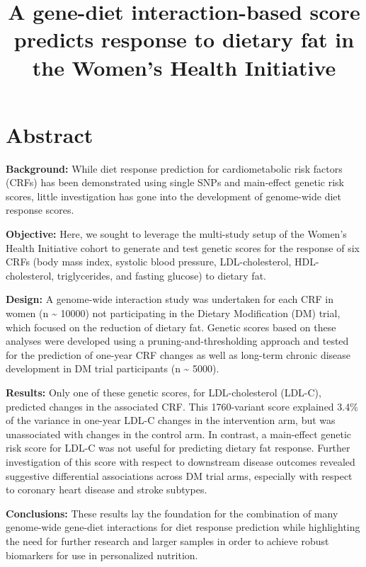 \documentclass[]{article}
\title{A gene-diet interaction-based score predicts response to dietary fat in
the Women's Health Initiative}
\author{}
\date{}
\begin{document}
\maketitle

\hypertarget{abstract}{%
\section{Abstract}\label{abstract}}

\textbf{Background:} While diet response prediction for cardiometabolic
risk factors (CRFs) has been demonstrated using single SNPs and
main-effect genetic risk scores, little investigation has gone into the
development of genome-wide diet response scores.

\textbf{Objective:} Here, we sought to leverage the multi-study setup of
the Women's Health Initiative cohort to generate and test genetic scores
for the response of six CRFs (body mass index, systolic blood pressure,
LDL-cholesterol, HDL-cholesterol, triglycerides, and fasting glucose) to
dietary fat.

\textbf{Design:} A genome-wide interaction study was undertaken for each
CRF in women (n \textasciitilde{} 10000) not participating in the
Dietary Modification (DM) trial, which focused on the reduction of
dietary fat. Genetic scores based on these analyses were developed using
a pruning-and-thresholding approach and tested for the prediction of
one-year CRF changes as well as long-term chronic disease development in
DM trial participants (n \textasciitilde{} 5000).

\textbf{Results:} Only one of these genetic scores, for LDL-cholesterol
(LDL-C), predicted changes in the associated CRF. This 1760-variant
score explained 3.4\% of the variance in one-year LDL-C changes in the
intervention arm, but was unassociated with changes in the control arm.
In contrast, a main-effect genetic risk score for LDL-C was not useful
for predicting dietary fat response. Further investigation of this score
with respect to downstream disease outcomes revealed suggestive
differential associations across DM trial arms, especially with respect
to coronary heart disease and stroke subtypes.

\textbf{Conclusions:} These results lay the foundation for the
combination of many genome-wide gene-diet interactions for diet response
prediction while highlighting the need for further research and larger
samples in order to achieve robust biomarkers for use in personalized
nutrition.
\end{document}

